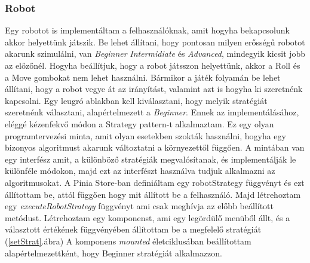 \documentclass[a4paper,twoside]{article}
\begin{document}
\subsubsection{Robot}
Egy robotot is implementáltam a felhasználóknak, amit hogyha bekapcsolunk akkor helyettünk játszik. Be lehet állítani, hogy pontosan milyen erősségű robotot akarunk szimulálni, van \textit{Beginner} \textit{Intermidiate} és \textit{Advanced}, mindegyik kicsit jobb az előzőnél. Hogyha beállítjuk, hogy a robot játsszon helyettünk, akkor a Roll és a Move gombokat nem lehet használni. Bármikor a játék folyamán be lehet állítani, hogy a robot vegye át az irányítást, valamint azt is hogyha ki szeretnénk kapcsolni. Egy leugró ablakban kell kiválasztani, hogy melyik stratégiát szeretnénk választani, alapértelmezett a \textit{Beginner}. Ennek az implementálásához, eléggé kézenfekvő módon a Strategy pattern-t alkalmaztam. Ez egy olyan programtervezési minta, amit olyan esetekben szokták használni, hogyha egy bizonyos algoritmust akarunk változtatni a környezettől függően. A mintában van egy interfész amit, a különböző stratégiák megvalósítanak, és implementálják le különféle módokon, majd ezt az interfészt használva tudjuk alkalmazni az algoritmusokat. A Pinia Store-ban definiáltam egy robotStrategy függvényt és ezt állítottam be, attól függően hogy mit állított be a felhasználó. Majd létrehoztam egy \textit{executeRobotStrategy} függvényt ami csak meghívja az előbb beállított metódust. Létrehoztam egy komponenst, ami egy legördülő menüből állt, és a választott értékének függvényében állítottam be a megfelelő stratégiát (\ref{setStrat}.ábra) A komponens \textit{mounted} életciklusában beállítottam alapértelmezettként, hogy Beginner stratégiát alkalmazzon.
\end{document}
